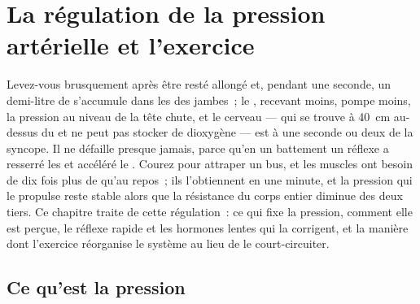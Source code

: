 \chapter{La régulation de la pression artérielle et l'exercice}\label{ch:b2:blood-pressure}

Levez-vous brusquement après être resté allongé et, pendant une
seconde, un demi-litre de  s'accumule dans les  des jambes~;
le , recevant moins, pompe moins, la pression au niveau de la tête
chute, et le cerveau --- qui se trouve à \qty{40}{cm} au-dessus du  et
ne peut pas stocker de dioxygène --- est à une seconde ou deux de la
syncope. Il ne défaille presque jamais, parce qu'en un battement un
réflexe a resserré les  et accéléré le . Courez pour
attraper un bus, et les muscles ont besoin de dix fois plus de 
qu'au repos~; ils l'obtiennent en une minute, et la pression qui le
propulse reste stable alors que la résistance du corps entier diminue
des deux tiers. Ce chapitre traite de cette régulation~: ce qui fixe la
pression, comment elle est perçue, le réflexe rapide et les hormones
lentes qui la corrigent, et la manière dont l'exercice réorganise le
système au lieu de le court-circuiter.

\section{Ce qu'est la pression}

